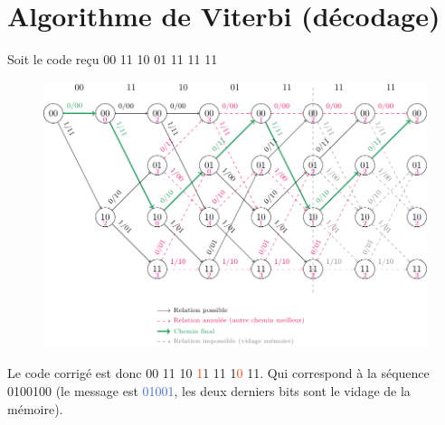 \documentclass[resume]{subfiles}
\begin{document}
\section{Algorithme de Viterbi (décodage)}
Soit le code reçu 00 11 10 01 11 11 11
\begin{figure}[H]
\centering
\includegraphics[width=0.9\columnwidth]{Viterbi.pdf}
\end{figure}
Le code corrigé est donc
00 11 10 \textcolor{OrangeRed}{1}1 11 1\textcolor{OrangeRed}{0} 11. Qui correspond à la séquence 0100100 (le message est \textcolor{RoyalBlue}{01001}, les deux derniers bits sont le vidage de la mémoire).
\end{document}
